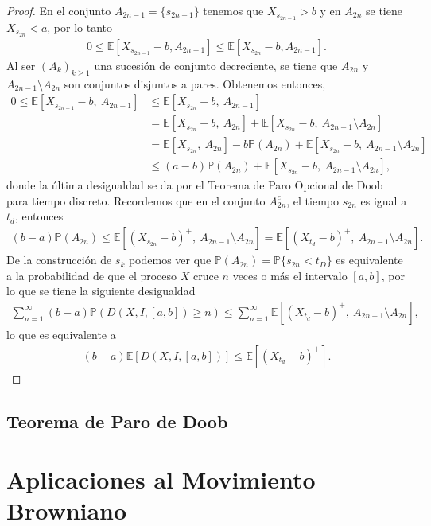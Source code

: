 \begin{proof}
En el conjunto $A_{2n - 1} = \{ s_{2n - 1} \}$ tenemos que $X_{s_{2n - 1}} > b$ y en $A_{2n}$ se tiene $X_{s_{2n}} < a$, por lo tanto
	\begin{align*}
		0 \leq \mathbb{E} \left[ X_{s_{2n - 1}} - b, A_{2n - 1} \right] \leq \mathbb{E} \left[ X_{s_{2n}} - b, A_{2n - 1} \right].
	\end{align*}
Al ser $(A_k)_{k \geq 1}$ una sucesión de conjunto decreciente, se tiene que $A_{2n}$ y $A_{2n - 1} \setminus A_{2n}$ son conjuntos disjuntos a pares. Obtenemos entonces, 
	\begin{align*}
		0 \leq \mathbb{E} \left[ X_{s_{2n - 1}} - b,\ A_{2n - 1} \right] & \leq \mathbb{E} \left[ X_{s_{2n}} - b, \ A_{2n - 1} \right] \\
        & = \mathbb{E} \left[ X_{s_{2n}} - b, \ A_{2n} \right] + \mathbb{E} \left[ X_{s_{2n}} - b, \ A_{2n - 1} \setminus A_{2n} \right] \\
        & = \mathbb{E} \left[ X_{s_{2n}}, \ A_{2n} \right] - b \mathbb{P} (A_{2n}) + \mathbb{E} \left[ X_{s_{2n}} - b, \ A_{2n - 1} \setminus A_{2n} \right] \\
        & \leq (a - b) \mathbb{P} (A_{2n}) + \mathbb{E} \left[ X_{s_{2n}} - b, \ A_{2n - 1} \setminus A_{2n} \right],
	\end{align*}
donde la última desigualdad se da por el Teorema de Paro Opcional de Doob para tiempo discreto. Recordemos que en el conjunto $A_{2n}^{c}$, el tiempo $s_{2n}$ es igual a $t_d$, entonces
	\begin{align*}
		(b - a) \mathbb{P}(A_{2n}) \leq \mathbb{E} \left[ (X_{s_{2n}} - b)^{+}, \ A_{2n - 1} \setminus A_{2n} \right] = \mathbb{E} \left[ (X_{t_d} - b)^{+}, \ A_{2n - 1} \setminus A_{2n} \right].
	\end{align*}
De la construcción de $s_k$ podemos ver que $\mathbb{P}(A_{2n}) = \mathbb{P} \{ s_{2n} < t_D \}$ es equivalente a la probabilidad de que el proceso $X$ cruce $n$ veces o más el intervalo $[a, b]$, por lo que se tiene la siguiente desigualdad
	\begin{align*}
		\sum_{n = 1}^{\infty} (b-a) \mathbb{P} \left( D(X, I, [a, b]) \geq n \right) \leq \sum_{n = 1}^{\infty} \mathbb{E} \left[ (X_{t_d} - b )^{+}, \ A_{2n - 1} \setminus A_{2n} \right],
	\end{align*}
lo que es equivalente a 
	\begin{align*}
		(b-a) \mathbb{E} \left[ D(X, I, [a, b]) \right] \leq \mathbb{E} \left[ (X_{t_d} - b )^{+} \right].
	\end{align*}
\end{proof}


\subsection{Teorema de Paro de Doob}


\section{Aplicaciones al Movimiento Browniano}





















